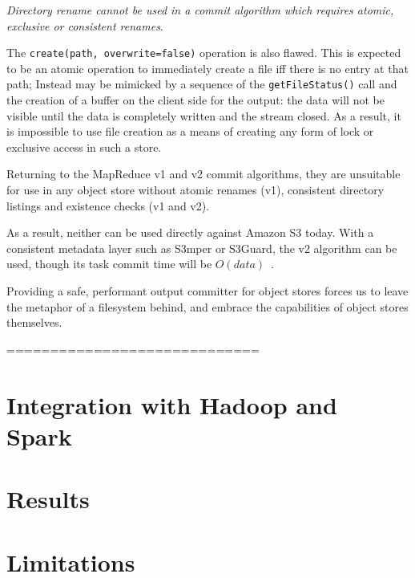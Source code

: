 \emph{Directory rename cannot be used in a commit algorithm which
requires atomic, exclusive or consistent renames}.

The \texttt{create(path, overwrite=false)} operation is also flawed.
This is expected to be an atomic operation to immediately create a file iff there is
no entry at that path;
Instead may be mimicked by a sequence of the \texttt{getFileStatus()} call
and the creation of a buffer on the client side for the output: the data
will not be visible until the data is completely written and the stream
closed.
As a result, it is impossible to use file creation as a means of creating any
form of lock or exclusive access in such a store.


Returning to the MapReduce v1 and v2 commit algorithms, they are unsuitable for
use in any object store without atomic renames (v1), consistent
directory listings and existence checks (v1 and v2).

As a result, neither can be used directly against Amazon S3 today.
With a consistent metadata layer such as S3mper or S3Guard, the v2 algorithm
can be used, though its task commit time will be $O(data)$\ \cite{S3mper,HADOOP-13345}.

Providing a safe, performant output committer for object stores forces
us to leave the metaphor of a filesystem behind, and embrace
the capabilities of object stores themselves.

=============================
\section{Integration with Hadoop and Spark}
\label{sec:integration}




\section{Results}
\label{sec:results}



\section{Limitations}
\label{sec:limitations}


